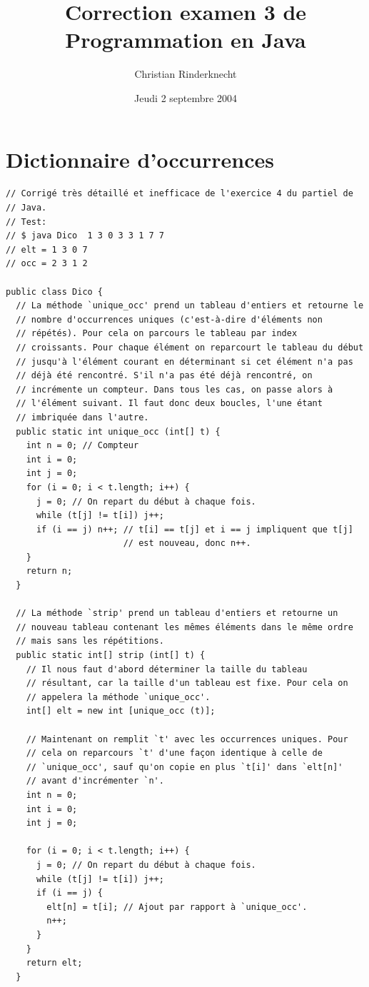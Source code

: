 \documentclass[11pt,a4paper]{article}
\title{Correction examen 3 de Programmation en Java}
\author{Christian Rinderknecht}
\date{Jeudi 2 septembre 2004}
\begin{document}
\maketitle


\section{Dictionnaire d'occurrences}

{\small
\begin{verbatim}
// Corrigé très détaillé et inefficace de l'exercice 4 du partiel de
// Java.
// Test:
// $ java Dico  1 3 0 3 3 1 7 7
// elt = 1 3 0 7
// occ = 2 3 1 2

public class Dico {
  // La méthode `unique_occ' prend un tableau d'entiers et retourne le
  // nombre d'occurrences uniques (c'est-à-dire d'éléments non
  // répétés). Pour cela on parcours le tableau par index
  // croissants. Pour chaque élément on reparcourt le tableau du début
  // jusqu'à l'élément courant en déterminant si cet élément n'a pas
  // déjà été rencontré. S'il n'a pas été déjà rencontré, on
  // incrémente un compteur. Dans tous les cas, on passe alors à
  // l'élément suivant. Il faut donc deux boucles, l'une étant
  // imbriquée dans l'autre.
  public static int unique_occ (int[] t) {
    int n = 0; // Compteur
    int i = 0;
    int j = 0;
    for (i = 0; i < t.length; i++) {
      j = 0; // On repart du début à chaque fois.
      while (t[j] != t[i]) j++;
      if (i == j) n++; // t[i] == t[j] et i == j impliquent que t[j]
                       // est nouveau, donc n++.
    }
    return n;
  }

  // La méthode `strip' prend un tableau d'entiers et retourne un
  // nouveau tableau contenant les mêmes éléments dans le même ordre
  // mais sans les répétitions.
  public static int[] strip (int[] t) {
    // Il nous faut d'abord déterminer la taille du tableau
    // résultant, car la taille d'un tableau est fixe. Pour cela on
    // appelera la méthode `unique_occ'.
    int[] elt = new int [unique_occ (t)];

    // Maintenant on remplit `t' avec les occurrences uniques. Pour
    // cela on reparcours `t' d'une façon identique à celle de
    // `unique_occ', sauf qu'on copie en plus `t[i]' dans `elt[n]'
    // avant d'incrémenter `n'.
    int n = 0;
    int i = 0;
    int j = 0;

    for (i = 0; i < t.length; i++) {
      j = 0; // On repart du début à chaque fois.
      while (t[j] != t[i]) j++;
      if (i == j) {
        elt[n] = t[i]; // Ajout par rapport à `unique_occ'.
        n++;
      }
    }
    return elt;
  }


\end{verbatim}}
\end{document}
